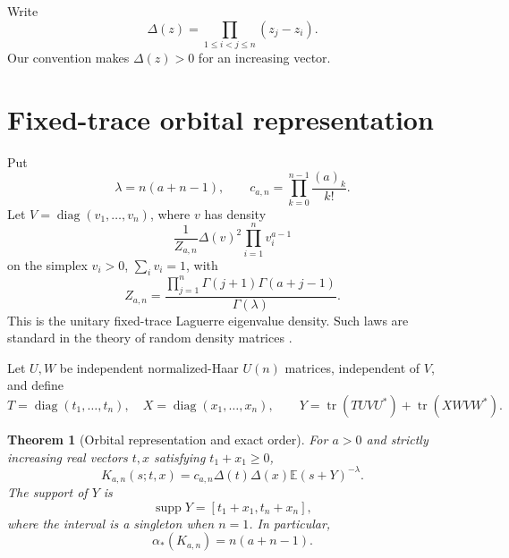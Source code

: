 \documentclass[11pt]{article}
\newtheorem{theorem}{Theorem}[section]
\theoremstyle{definition}
\theoremstyle{remark}
\newcommand{\E}{\mathbb{E}}
\newcommand{\tr}{\operatorname{tr}}
\newcommand{\supp}{\operatorname{supp}}
\begin{document}
Write
\begin{equation}\label{eq:vandermonde}
\Delta(z)=\prod_{1\le i<j\le n}(z_j-z_i).
\end{equation}
Our convention makes $\Delta(z)>0$ for an increasing vector.

\section{Fixed-trace orbital representation}

Put
\begin{equation}\label{eq:lambda-c}
\lambda=n(a+n-1),\qquad
c_{a,n}=\prod_{k=0}^{n-1}\frac{(a)_k}{k!}.
\end{equation}
Let $V=\operatorname{diag}(v_1,\ldots,v_n)$, where $v$ has density
\begin{equation}\label{eq:fixed-trace-density}
\frac{1}{Z_{a,n}}\Delta(v)^2\prod_{i=1}^n v_i^{a-1}
\end{equation}
on the simplex $v_i>0$, $\sum_i v_i=1$, with
\begin{equation}\label{eq:Z}
Z_{a,n}
=\frac{\prod_{j=1}^{n}\Gamma(j+1)\Gamma(a+j-1)}
       {\Gamma(\lambda)}.
\end{equation}
This is the unitary fixed-trace Laguerre eigenvalue density. Such laws are
standard in the theory of random density matrices
\citep{SommersZyczkowski2004}.

Let $U,W$ be independent normalized-Haar $U(n)$ matrices, independent of
$V$, and define
\begin{equation}\label{eq:Y}
T=\operatorname{diag}(t_1,\ldots,t_n),\quad
X=\operatorname{diag}(x_1,\ldots,x_n),
\qquad
Y=\tr(TUVU^*)+\tr(XWVW^*).
\end{equation}

\begin{theorem}[Orbital representation and exact order]
\label{thm:main}
For $a>0$ and strictly increasing real vectors $t,x$ satisfying
$t_1+x_1\ge0$,
\begin{equation}\label{eq:main-representation}
K_{a,n}(s;t,x)
=c_{a,n}\Delta(t)\Delta(x)\E(s+Y)^{-\lambda}.
\end{equation}
The support of $Y$ is
\begin{equation}\label{eq:support}
\supp Y=[t_1+x_1,t_n+x_n],
\end{equation}
where the interval is a singleton when $n=1$. In particular,
\begin{equation}\label{eq:exact-order}
\alpha_*(K_{a,n})=n(a+n-1).
\end{equation}
\end{theorem}
\end{document}

